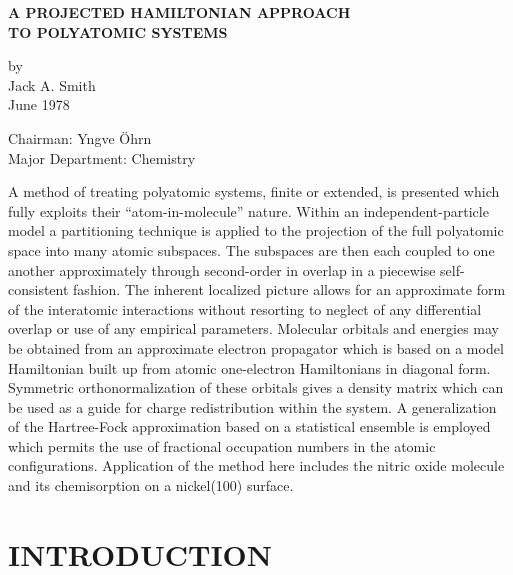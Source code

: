 \documentclass[12pt,letterpaper]{report}
\begin{document}
\begin{center}
{\large\textbf{A PROJECTED HAMILTONIAN APPROACH\\TO POLYATOMIC SYSTEMS}}

\vspace{0.3in}

by\\
Jack A. Smith\\
June 1978

\vspace{0.3in}

Chairman: Yngve Öhrn\\
Major Department: Chemistry
\end{center}

\vspace{0.3in}

A method of treating polyatomic systems, finite or extended, is presented which fully exploits their ``atom-in-molecule'' nature. Within an independent-particle model a partitioning technique is applied to the projection of the full polyatomic space into many atomic subspaces. The subspaces are then each coupled to one another approximately through second-order in overlap in a piecewise self-consistent fashion. The inherent localized picture allows for an approximate form of the interatomic interactions without resorting to neglect of any differential overlap or use of any empirical parameters. Molecular orbitals and energies may be obtained from an approximate electron propagator which is based on a model Hamiltonian built up from atomic one-electron Hamiltonians in diagonal form. Symmetric orthonormalization of these orbitals gives a density matrix which can be used as a guide for charge redistribution within the system. A generalization of the Hartree-Fock approximation based on a statistical ensemble is employed which permits the use of fractional occupation numbers in the atomic configurations. Application of the method here includes the nitric oxide molecule and its chemisorption on a nickel(100) surface.

\newpage
{}

\chapter{INTRODUCTION}
\end{document}
